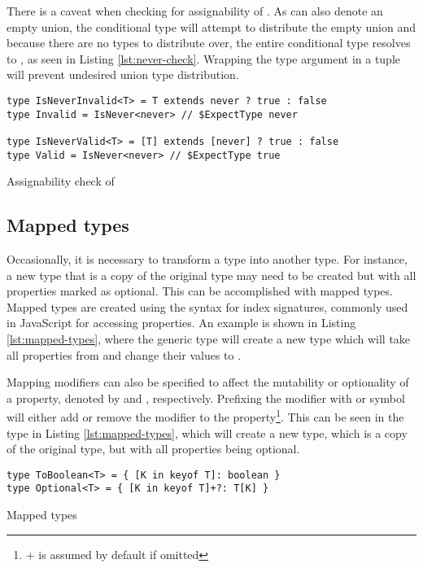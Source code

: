 There is a caveat when checking for assignability of . As  can also denote an empty union, the conditional type will attempt to distribute the empty union and because there are no types to distribute over, the entire conditional type resolves to , as seen in Listing \ref{lst:never-check}. Wrapping the type argument in a tuple will prevent undesired union type distribution.

\begin{listing}[ht]
\begin{verbatim}
type IsNeverInvalid<T> = T extends never ? true : false
type Invalid = IsNever<never> // $ExpectType never

type IsNeverValid<T> = [T] extends [never] ? true : false
type Valid = IsNever<never> // $ExpectType true
\end{verbatim}
\caption{Assignability check of }\label{lst:never-check}
\end{listing}

\subsection{Mapped types}\label{sec:mapped-types}

Occasionally, it is necessary to transform a type into another type. For instance, a new type that is a copy of the original type may need to be created but with all properties marked as optional. This can be accomplished with mapped types. Mapped types are created using the syntax for index signatures, commonly used in JavaScript for accessing properties. An example is shown in Listing \ref{lst:mapped-types}, where the generic type  will create a new type which will take all properties from  and change their values to .

Mapping modifiers can also be specified to affect the mutability or optionality of a property, denoted by  and , respectively. Prefixing the modifier with \code{+} or \code{-} symbol will either add or remove the modifier to the property\footnote{+ is assumed by default if omitted}. This can be seen in the  type in Listing \ref{lst:mapped-types}, which will create a new type, which is a copy of the original type, but with all properties being optional.

\begin{listing}[ht]
  \begin{verbatim}
type ToBoolean<T> = { [K in keyof T]: boolean }
type Optional<T> = { [K in keyof T]+?: T[K] }
\end{verbatim}
  \caption{Mapped types}\label{lst:mapped-types}
\end{listing}

